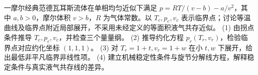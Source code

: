 一摩尔经典范德瓦耳斯流体在单相均匀近似下满足 \(p=RT/(v-b)-a/v^2\)，其中 \(a,b>0\)，摩尔体积 \(v>b\)，\(R\) 为气体常数。以 \(T_c,p_c,v_c\) 表示临界点；讨论等温曲线及临界点附近局部展开，不采用未经定义的等面积液气共存近似。
(1) 由拐点条件推导 \(T_c,p_c,v_c\)，并检查三个量量纲。
(2) 推导约化方程 \(p_r(T_r,v_r)\)，检验临界点对应约化坐标 \((1,1,1)\)。
(3) 对 \(T_r=1+t,v_r=1+w\) 在小 \(t,w\) 下展开，给出最低非平凡临界非线性项。
(4) 建立机械稳定性条件与旋节分解线方程，解释稳定条件与真实液气共存线的差异。

